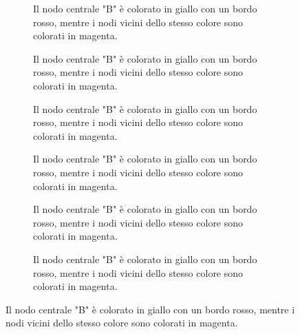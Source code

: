 \begin{figure}[H]
    \centering
    \begin{subfigure}{0.3\textwidth}
        
        \caption{Il nodo centrale "B" è colorato in giallo con un bordo rosso, mentre i nodi vicini dello stesso colore sono colorati in magenta.}
    \end{subfigure}
    \hfill
    \begin{subfigure}{0.3\textwidth}
        
        \caption{Il nodo centrale "B" è colorato in giallo con un bordo rosso, mentre i nodi vicini dello stesso colore sono colorati in magenta.}
    \end{subfigure}
    \hfill
    \begin{subfigure}{0.3\textwidth}
        
        \caption{Il nodo centrale "B" è colorato in giallo con un bordo rosso, mentre i nodi vicini dello stesso colore sono colorati in magenta.}
    \end{subfigure}

    \vspace{20pt}
    \begin{subfigure}{0.3\textwidth}
        
        \caption{Il nodo centrale "B" è colorato in giallo con un bordo rosso, mentre i nodi vicini dello stesso colore sono colorati in magenta.}
    \end{subfigure}
    \hfill
    \begin{subfigure}{0.3\textwidth}
        
        \caption{Il nodo centrale "B" è colorato in giallo con un bordo rosso, mentre i nodi vicini dello stesso colore sono colorati in magenta.}
    \end{subfigure}
    \hfill
    \begin{subfigure}{0.3\textwidth}
        
        \caption{Il nodo centrale "B" è colorato in giallo con un bordo rosso, mentre i nodi vicini dello stesso colore sono colorati in magenta.}
    \end{subfigure}
\end{figure}